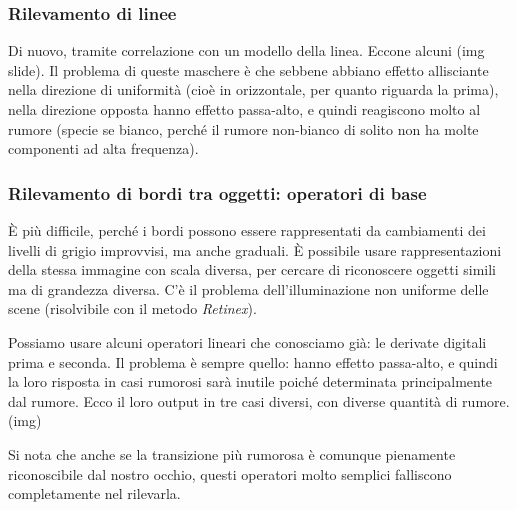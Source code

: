 \documentclass[a4paper,11pt]{article}
\begin{document}
\subsubsection{Rilevamento di linee}
Di nuovo, tramite correlazione con un modello della linea. Eccone alcuni (img slide).
Il problema di queste maschere è che sebbene abbiano effetto allisciante nella direzione di uniformità (cioè in orizzontale, per quanto riguarda la prima),
nella direzione opposta hanno effetto passa-alto, e quindi reagiscono molto al rumore (specie se bianco, perché il rumore non-bianco di solito non ha molte componenti
ad alta frequenza).

\subsubsection{Rilevamento di bordi tra oggetti: operatori di base}
È più difficile, perché i bordi possono essere rappresentati da cambiamenti dei
livelli di grigio improvvisi, ma anche graduali.
È possibile usare rappresentazioni della stessa immagine con scala diversa, per cercare di riconoscere oggetti simili ma di grandezza diversa.
C'è il problema dell'illuminazione non uniforme delle scene (risolvibile con il metodo \textit{Retinex}).
\par
Possiamo usare alcuni operatori lineari che conosciamo già: le derivate digitali prima e seconda. Il problema è sempre quello: hanno effetto passa-alto,
e quindi la loro risposta in casi rumorosi sarà inutile poiché determinata principalmente dal rumore.
Ecco il loro output in tre casi diversi, con diverse quantità di rumore.
(img)
\par
Si nota che anche se la transizione più rumorosa è comunque pienamente riconoscibile dal nostro occhio, questi operatori molto semplici falliscono completamente nel rilevarla.
\end{document}
